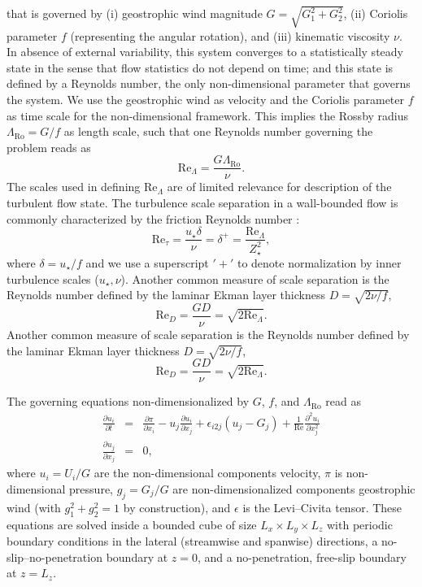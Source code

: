 \documentclass[smallcondensed,final]{svjour3}
\newcommand{\p}{\partial}
\newcommand{\RO}{\mathrm{Ro}}
\newcommand{\RE}{\mathrm{Re}}
\newcommand{\LR}{\Lambda_\RO}
\begin{document}
that is governed by %
(i)   geostrophic wind magnitude $G=\sqrt{G_1^2+G_2^2}$,
(ii)  Coriolis parameter $f$ (representing the angular rotation), and
(iii) kinematic viscosity $\nu$.
%
In absence of external variability, this system converges to a statistically steady state in the sense that flow
statistics do not depend on time; and this state is defined by a Reynolds number,
the only non-dimensional parameter that governs the system.
%
We use the geostrophic wind as velocity and the Coriolis parameter $f$ as time scale for the non-dimensional
framework.
%
This implies the Rossby radius $\LR=G/f$ as length scale, such that one Reynolds number
governing the problem reads as
%
\begin{equation}
  \RE_\Lambda=\frac{G \LR }{\nu}. 
\end{equation}
%
The scales used in defining $\RE_\Lambda$ are of limited relevance for description of the turbulent flow state.
%
The turbulence scale separation in a wall-bounded flow is commonly characterized by the friction Reynolds number
\citep{jimenez:ARF2012}:
\begin{equation}
  \RE_\tau = \frac{u_\star\delta}{\nu} = \delta^+ = \frac{\RE_\Lambda}{Z_\star^2}, 
\end{equation}
where $\delta=u_\star/f$ and we use a superscript $'+'$ to denote normalization by inner turbulence
scales ($u_\star, \nu$).
%
Another common measure of scale separation is the Reynolds number defined by the laminar Ekman layer
thickness $D=\sqrt{2\nu/f}$, 
\begin{equation}
  \RE_D = \frac{G D} {\nu } = \sqrt{2 \RE_\Lambda}. 
\end{equation}
%
Another common measure of scale separation is the Reynolds number defined by the laminar Ekman layer
thickness $D=\sqrt{2\nu/f}$, 
\begin{equation}
  \RE_D = \frac{G D} {\nu } = \sqrt{2 \RE_\Lambda}. 
\end{equation}
%
\par
%
The governing equations  non-dimensionalized by $G$, $f$, and $\Lambda_\mathrm{\RO}$ read as 
\begin{subequations} 
\label{eqn:governing} 
\begin{eqnarray}
  \frac{\partial u_i}{\partial t} &=& \frac{\p \pi}{\p x_i} - u_j \frac{\p u_i}{\p x_j} + \epsilon_{i2j} (u_j -G_j)   + \frac{1}{\RE} \frac{\p^2 u_i}{\p x_{j}^2} \\ 
  \frac{\partial u_j}{\partial x_j} &=& 0,   
\end{eqnarray} 
\end{subequations}
where $u_i=U_i/G$ are the non-dimensional components velocity, $\pi$ is non-dimen\-sio\-nal pressure, $g_j=G_j/G$ are non-dimensionalized components geostrophic wind (with $g_{1}^2+g_{2}^2=1$ by construction), and $\epsilon$ is the Levi--Civita tensor.
%
These equations are solved inside a bounded cube of size $L_x \times L_y \times L_z$ with periodic boundary conditions in the lateral (streamwise and spanwise) directions, a no-slip--no-penetration boundary at $z=0$, and
a no-penetration, free-slip boundary at $z=L_z$.
%
\end{document}
